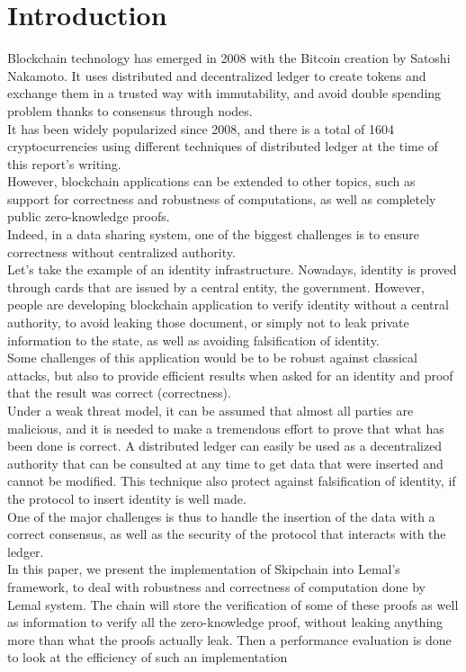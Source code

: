 \documentclass{article}
\begin{document}
\newpage

\tableofcontents

\newpage

\section{Introduction}
Blockchain \cite{bitcoin} technology has emerged in 2008 with the Bitcoin creation by Satoshi Nakamoto. It uses distributed and decentralized ledger to create tokens and exchange them in a trusted way with immutability, and avoid double spending problem \cite{spending} thanks to consensus through nodes.\\
It has been widely popularized since 2008, and there is a total of 1604 cryptocurrencies \cite{coinmarket} using different techniques of distributed ledger at the time of this report's writing.\\
However, blockchain applications can be extended to other topics, such as support for correctness and robustness of computations, as well as completely public zero-knowledge proofs.\\
Indeed, in a data sharing system, one of the biggest challenges is to ensure correctness without centralized authority.\\
Let's take the example of an identity infrastructure. Nowadays, identity is proved through cards that are issued by a central entity, the government. However, people are developing blockchain application to verify identity without a central authority, to avoid leaking those document, or simply not to leak private information to the state, as well as avoiding falsification of identity.\\ 
Some challenges of this application would be to be robust against classical attacks, but also to provide efficient results when asked for an identity and proof that the result was correct (correctness).\\
Under a weak threat model, it can be assumed that almost all parties are malicious, and it is needed to make a tremendous effort to prove that what has been done is correct. A distributed ledger can easily be used as a decentralized authority that can be consulted at any time to get data that were inserted and cannot be modified. This technique also protect against falsification of identity, if the protocol to insert identity is well made.\\
One of the major challenges is thus to handle the insertion of the data with a correct consensus, as well as the security of the protocol that interacts with the ledger.\\
In this paper, we present the implementation of Skipchain \cite{chainiac,skipchain} into Lemal's framework, to deal with robustness and correctness of computation done by Lemal system. The chain will store the verification of some of these proofs as well as information to verify all the zero-knowledge proof, without leaking anything more than what the proofs actually leak. Then a performance evaluation is done to look at the efficiency of such an implementation
\end{document}
